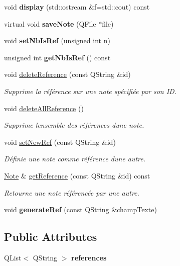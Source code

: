 \begin{DoxyCompactItemize}
void {\bfseries display} (std\+::ostream \&f=std\+::cout) const
\item 
\mbox{\label{class_note_a0c2cc72d7f3235c665a30ef915c5c58d}} 
virtual void {\bfseries save\+Note} (Q\+File $\ast$file)
\item 
\mbox{\label{class_note_acf0ffc4f88903851dce3abf75c3d53f2}} 
void {\bfseries set\+Nb\+Is\+Ref} (unsigned int n)
\item 
\mbox{\label{class_note_a1cb41601ca2dc7c020053c4c0b58f12e}} 
unsigned int {\bfseries get\+Nb\+Is\+Ref} () const
\item 
void \hyperlink{class_note_a91c86cf6ed18e4badb59a41e737a15fa}{delete\+Reference} (const Q\+String \&id)
\begin{DoxyCompactList}\small\item\em Supprime la référence sur une note spécifiée par son ID. \end{DoxyCompactList}\item 
void \hyperlink{class_note_aacbb89b120107a4b25dd16043908c693}{delete\+All\+Reference} ()
\begin{DoxyCompactList}\small\item\em Supprime l\textquotesingle{}ensemble des références d\textquotesingle{}une note. \end{DoxyCompactList}\item 
void \hyperlink{class_note_a3af2edc369310b9f122bd1fd6dbfa717}{set\+New\+Ref} (const Q\+String \&id)
\begin{DoxyCompactList}\small\item\em Définie une note comme référence d\textquotesingle{}une autre. \end{DoxyCompactList}\item 
\hyperlink{class_note}{Note} \& \hyperlink{class_note_a8e3ba6961f62a38f49b5fd209c083896}{get\+Reference} (const Q\+String \&id) const
\begin{DoxyCompactList}\small\item\em Retourne une note référencée par une autre. \end{DoxyCompactList}\item 
\mbox{\label{class_note_a5a0cb370ddd5a3da10fe8aa8a256d661}} 
void {\bfseries generate\+Ref} (const Q\+String \&champ\+Texte)
\end{DoxyCompactItemize}
\subsection*{Public Attributes}
\begin{DoxyCompactItemize}
\item 
\mbox{\label{class_note_ad8918cd74c86c9e00d72cb1a6a5a0f88}} 
Q\+List$<$ Q\+String $>$ {\bfseries references}
\end{DoxyCompactItemize}


